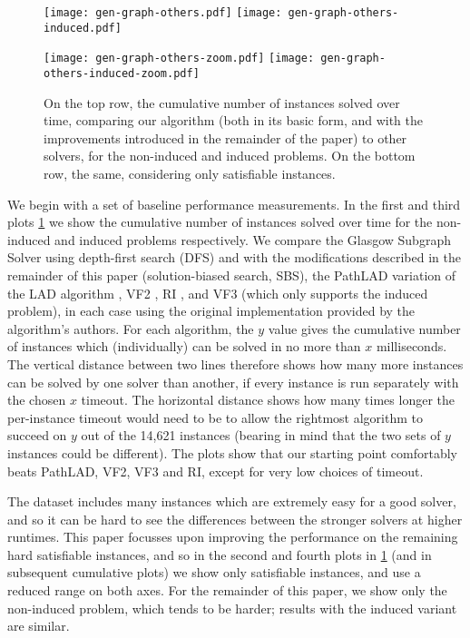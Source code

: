 \documentclass[runningheads]{llncs}
\begin{document}
\begin{figure}[tb]
    \texttt{[image: gen-graph-others.pdf]}
    \hfill
    \texttt{[image: gen-graph-others-induced.pdf]}

    \bigskip

    \texttt{[image: gen-graph-others-zoom.pdf]}
    \hfill
    \texttt{[image: gen-graph-others-induced-zoom.pdf]}

    \caption{On the top row, the cumulative number of instances solved over time, comparing our algorithm
    (both in its basic form, and with the improvements introduced in the remainder of the paper) to
    other solvers, for the non-induced and induced problems. On the bottom row, the same,
    considering only satisfiable instances.}
    \label{figure:others}
\end{figure}

We begin with a set of baseline performance measurements. In the first and
third plots \cref{figure:others} we show the cumulative number of instances solved over time for the
non-induced and induced problems respectively. We compare the Glasgow Subgraph Solver using
depth-first search (DFS) and with the modifications described in the remainder of this paper
(solution-biased search, SBS), the PathLAD variation of the LAD algorithm
\cite{DBLP:journals/ai/Solnon10,DBLP:conf/lion/KotthoffMS16}, VF2
\cite{DBLP:journals/pami/CordellaFSV04}, RI \cite{DBLP:journals/bmcbi/BonniciGPSF13}, and VF3
\cite{DBLP:conf/gbrpr/CarlettiFSV17} (which only supports the induced problem), in each case using
the original implementation provided by the algorithm's authors. For each algorithm, the $y$ value
gives the cumulative number of instances which (individually) can be solved in no more than $x$
milliseconds.  The vertical distance between two lines therefore shows how many more instances can
be solved by one solver than another, if every instance is run separately with the chosen $x$
timeout. The horizontal distance shows how many times longer the per-instance timeout would need to
be to allow the rightmost algorithm to succeed on $y$ out of the 14,621 instances (bearing in mind
that the two sets of $y$ instances could be different).  The plots show that our starting point
comfortably beats PathLAD, VF2, VF3 and RI, except for very low choices of timeout.

The dataset includes many instances which are extremely easy for a good solver, and so it can be
hard to see the differences between the stronger solvers at higher runtimes. This paper focusses
upon improving the performance on the remaining hard satisfiable instances, and so in the second and
fourth plots in \cref{figure:others} (and in subsequent cumulative plots) we show only satisfiable
instances, and use a reduced range on both axes.  For the remainder of this paper, we show only
the non-induced problem, which tends to be harder; results with the induced variant are similar.
\end{document}
